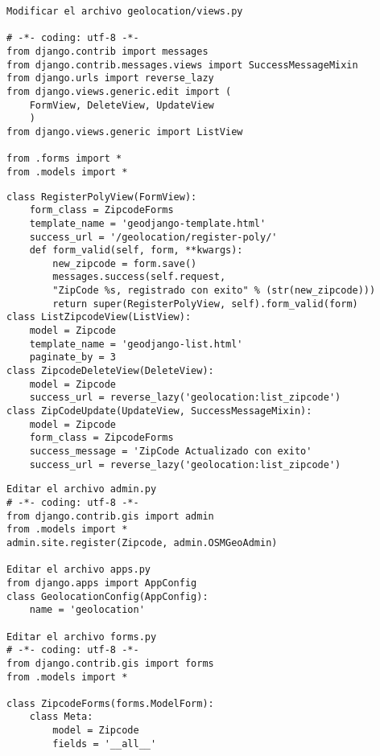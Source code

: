 \documentclass[xcolor=dvipsnames]{beamer}
\begin{document}
\begin{frame}[fragile]
\begin{verbatim}
Modificar el archivo geolocation/views.py

# -*- coding: utf-8 -*-
from django.contrib import messages
from django.contrib.messages.views import SuccessMessageMixin
from django.urls import reverse_lazy
from django.views.generic.edit import (
    FormView, DeleteView, UpdateView
    )
from django.views.generic import ListView

from .forms import *
from .models import *

\end{verbatim}
\end{frame}

\begin{frame}[fragile]
\begin{verbatim}
class RegisterPolyView(FormView):
    form_class = ZipcodeForms
    template_name = 'geodjango-template.html'
    success_url = '/geolocation/register-poly/'
    def form_valid(self, form, **kwargs):
        new_zipcode = form.save()
        messages.success(self.request, 
        "ZipCode %s, registrado con exito" % (str(new_zipcode)))
        return super(RegisterPolyView, self).form_valid(form)
class ListZipcodeView(ListView):
    model = Zipcode
    template_name = 'geodjango-list.html'
    paginate_by = 3
class ZipcodeDeleteView(DeleteView):
    model = Zipcode
    success_url = reverse_lazy('geolocation:list_zipcode')
class ZipCodeUpdate(UpdateView, SuccessMessageMixin):
    model = Zipcode
    form_class = ZipcodeForms
    success_message = 'ZipCode Actualizado con exito'
    success_url = reverse_lazy('geolocation:list_zipcode')
\end{verbatim}
\end{frame}

\begin{frame}[fragile]
\begin{verbatim}
Editar el archivo admin.py
# -*- coding: utf-8 -*-
from django.contrib.gis import admin
from .models import *
admin.site.register(Zipcode, admin.OSMGeoAdmin)

Editar el archivo apps.py
from django.apps import AppConfig
class GeolocationConfig(AppConfig):
    name = 'geolocation'

Editar el archivo forms.py
# -*- coding: utf-8 -*-
from django.contrib.gis import forms
from .models import *

class ZipcodeForms(forms.ModelForm):
    class Meta:
        model = Zipcode
        fields = '__all__'
\end{verbatim}
\end{frame}
\end{document}
